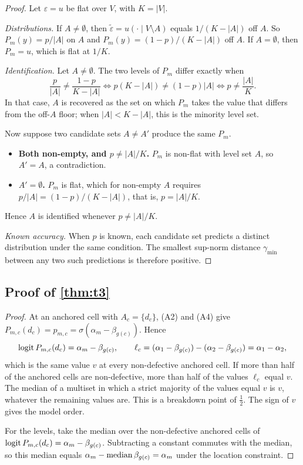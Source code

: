\begin{proof}
Let $\varepsilon=u$ be flat over $V$, with $K=|V|$.

\emph{Distributions.} If $A\neq\emptyset$, then $\tilde\varepsilon=u(\cdot\mid V\setminus A)$ equals $1/(K-|A|)$ off $A$. So $P_m(y)=p/|A|$ on $A$ and $P_m(y)=(1-p)/(K-|A|)$ off $A$. If $A=\emptyset$, then $P_m=u$, which is flat at $1/K$.

\emph{Identification.} Let $A\neq\emptyset$. The two levels of $P_m$ differ exactly when
\[
\frac{p}{|A|}\neq\frac{1-p}{K-|A|}\iff p(K-|A|)\neq(1-p)|A|\iff p\neq\frac{|A|}{K}.
\]
In that case, $A$ is recovered as the set on which $P_m$ takes the value that differs from the off-$A$ floor; when $|A|<K-|A|$, this is the minority level set.

Now suppose two candidate sets $A\neq A'$ produce the same $P_m$.
\begin{itemize}[leftmargin=*]
\item \textbf{Both non-empty, and $p\neq|A|/K$.} $P_m$ is non-flat with level set $A$, so $A'=A$, a contradiction.
\item \textbf{$A'=\emptyset$.} $P_m$ is flat, which for non-empty $A$ requires $p/|A|=(1-p)/(K-|A|)$, that is, $p=|A|/K$.
\end{itemize}
Hence $A$ is identified whenever $p\neq|A|/K$.

\emph{Known accuracy.} When $p$ is known, each candidate set predicts a distinct distribution under the same condition. The smallest sup-norm distance $\gamma_{\min}$ between any two such predictions is therefore positive.
\end{proof}

\subsection{Proof of \cref{thm:t3}}

\begin{proof}
At an anchored cell with $A_c=\{d_c\}$, (A2) and (A4) give $P_{m,c}(d_c)=p_{m,c}=\sigma(\alpha_m-\beta_{g(c)})$. Hence
\[
\operatorname{logit} P_{m,c}(d_c)=\alpha_m-\beta_{g(c)},\qquad
\ell_c=(\alpha_1-\beta_{g(c)})-(\alpha_2-\beta_{g(c)})=\alpha_1-\alpha_2,
\]
which is the same value $v$ at every non-defective anchored cell. If more than half of the anchored cells are non-defective, more than half of the values $\ell_c$ equal $v$. The median of a multiset in which a strict majority of the values equal $v$ is $v$, whatever the remaining values are. This is a breakdown point of $\tfrac12$. The sign of $v$ gives the model order.

For the levels, take the median over the non-defective anchored cells of $\operatorname{logit} P_{m,c}(d_c)=\alpha_m-\beta_{g(c)}$. Subtracting a constant commutes with the median, so this median equals $\alpha_m-\operatorname*{median}\beta_{g(c)}=\alpha_m$ under the location constraint.
\end{proof}

